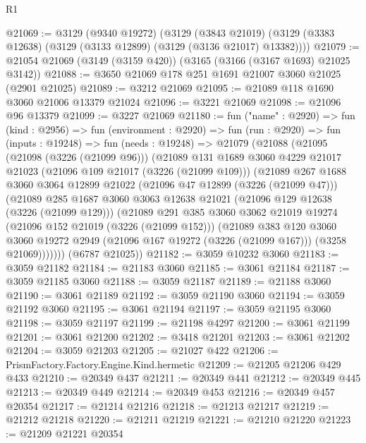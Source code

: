 \begin{lexlean}{R1}
\begin{coremodule}
@21069 := @3129
    (@9340 @19272)
    (@3129
      (@3843 @21019)
      (@3129 (@3383 @12638) (@3129 (@3133 @12899) (@3129 (@3136 @21017) @13382))))
@21079 := @21054 @21069 (@3149 (@3159 @420)) (@3165 (@3166 (@3167 @1693) @21025 @3142))
@21088 := @3650 @21069 @178 @251 @1691 @21007 @3060 @21025 (@2901 @21025)
@21089 := @3212 @21069
@21095 := @21089 @118 @1690 @3060 @21006 @13379 @21024
@21096 := @3221 @21069
@21098 := @21096 @96 @13379
@21099 := @3227 @21069
@21180 := fun ("name" : @2920) =>
  fun (kind : @2956) =>
  fun (environment : @2920) =>
  fun (run : @2920) =>
  fun (inputs : @19248) =>
  fun (needs : @19248) =>
  @21079
    (@21088
      (@21095
        (@21098 (@3226 (@21099 @96)))
        (@21089
          @131
          @1689
          @3060
          @4229
          @21017
          @21023
          (@21096 @109 @21017 (@3226 (@21099 @109)))
          (@21089
            @267
            @1688
            @3060
            @3064
            @12899
            @21022
            (@21096 @47 @12899 (@3226 (@21099 @47)))
            (@21089
              @285
              @1687
              @3060
              @3063
              @12638
              @21021
              (@21096 @129 @12638 (@3226 (@21099 @129)))
              (@21089
                @291
                @385
                @3060
                @3062
                @21019
                @19274
                (@21096 @152 @21019 (@3226 (@21099 @152)))
                (@21089
                  @383
                  @120
                  @3060
                  @3060
                  @19272
                  @2949
                  (@21096 @167 @19272 (@3226 (@21099 @167)))
                  (@3258 @21069)))))))
      (@6787 @21025))
@21182 := @3059 @10232 @3060
@21183 := @3059 @21182
@21184 := @21183 @3060
@21185 := @3061 @21184
@21187 := @3059 @21185 @3060
@21188 := @3059 @21187
@21189 := @21188 @3060
@21190 := @3061 @21189
@21192 := @3059 @21190 @3060
@21194 := @3059 @21192 @3060
@21195 := @3061 @21194
@21197 := @3059 @21195 @3060
@21198 := @3059 @21197
@21199 := @21198 @4297
@21200 := @3061 @21199
@21201 := @3061 @21200
@21202 := @3418 @21201
@21203 := @3061 @21202
@21204 := @3059 @21203
@21205 := @21027 @422
@21206 := PrismFactory.Factory.Engine.Kind.hermetic
@21209 := @21205 @21206 @429 @433
@21210 := @20349 @437
@21211 := @20349 @441
@21212 := @20349 @445
@21213 := @20349 @449
@21214 := @20349 @453
@21216 := @20349 @457 @20354
@21217 := @21214 @21216
@21218 := @21213 @21217
@21219 := @21212 @21218
@21220 := @21211 @21219
@21221 := @21210 @21220
@21223 := @21209 @21221 @20354

\end{coremodule}
\end{lexlean}
